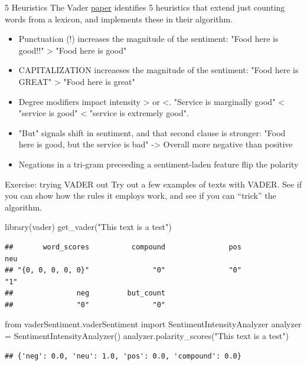 \documentclass[
  10pt,
  ignorenonframetext,
  aspectratio=169]{beamer}
\newenvironment{Shaded}{\begin{snugshade}}{\end{snugshade}}
\newcommand{\FunctionTok}[1]{\textcolor[rgb]{0.94,0.94,0.56}{#1}}
\newcommand{\ImportTok}[1]{\textcolor[rgb]{0.80,0.80,0.80}{#1}}
\newcommand{\NormalTok}[1]{\textcolor[rgb]{0.80,0.80,0.80}{#1}}
\newcommand{\OperatorTok}[1]{\textcolor[rgb]{0.94,0.94,0.82}{#1}}
\newcommand{\StringTok}[1]{\textcolor[rgb]{0.80,0.58,0.58}{#1}}
\begin{document}
\begin{frame}{5 Heuristics}
\protect\hypertarget{heuristics}{}
The Vader
\href{https://www.aaai.org/ocs/index.php/ICWSM/ICWSM14/paper/view/8109/8122}{paper}
identifies 5 heuristics that extend just counting words from a lexicon,
and implements these in their algorithm.

\begin{itemize}
  \item<1->Punctuation (!) increases the magnitude of the sentiment: "Food here is good!!" > "Food here is good"
  \item<2->CAPITALIZATION increaeses the magnitude of the sentiment: "Food here is GREAT" > "Food here is great"
  \item<3->Degree modifiers impact intensity > or <. "Service is marginally good" < "service is good" < "service is extremely good".
  \item<4->"But" signals shift in sentiment, and that second clause is stronger: "Food here is good, but the service is bad" -> Overall more negative than positive
  \item<5->Negations in a tri-gram preceeding a sentiment-laden feature flip the polarity
\end{itemize}
\end{frame}

\begin{frame}[fragile]{Exercise: trying VADER out}
\protect\hypertarget{exercise-trying-vader-out}{}
Try out a few examples of texts with VADER. See if you can show how the
rules it employs work, and see if you can ``trick'' the algorithm.

\medskip

\begin{Shaded}
\begin{Highlighting}[]
\FunctionTok{library}\NormalTok{(vader)}
\FunctionTok{get\_vader}\NormalTok{(}\StringTok{"This text is a test"}\NormalTok{)}
\end{Highlighting}
\end{Shaded}

\begin{verbatim}
##       word_scores          compound               pos               neu 
## "{0, 0, 0, 0, 0}"               "0"               "0"               "1" 
##               neg         but_count 
##               "0"               "0"
\end{verbatim}

\medskip

\begin{Shaded}
\begin{Highlighting}[]
\ImportTok{from}\NormalTok{ vaderSentiment.vaderSentiment }\ImportTok{import}\NormalTok{ SentimentIntensityAnalyzer}
\NormalTok{analyzer }\OperatorTok{=}\NormalTok{ SentimentIntensityAnalyzer()}
\NormalTok{analyzer.polarity\_scores(}\StringTok{"This text is a test"}\NormalTok{)}
\end{Highlighting}
\end{Shaded}

\begin{verbatim}
## {'neg': 0.0, 'neu': 1.0, 'pos': 0.0, 'compound': 0.0}
\end{verbatim}
\end{frame}
\end{document}
